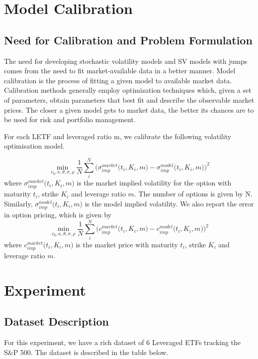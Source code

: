 \documentclass{article}
\begin{document}
\section{Model Calibration}
\subsection{Need for Calibration and Problem Formulation}
The need for developing stochastic volatility models and SV models with jumps comes from the need to fit market-available data in a better manner. Model calibration is the process of fitting a given model to available market data. Calibration methods generally employ optimization techniques which, given a set of parameters, obtain parameters that best fit and describe the observable market prices. The closer a given model gets to market data, the better its chances are to be used for risk and portfolio management. 
\newline\newline

For each LETF and leveraged ratio m, we calibrate the following volatility optimisation model.

\begin{equation}
    \min_{v_{0},\kappa,\theta,\sigma,\rho}\frac{1}{N}\sum_{i}^{N}\big(\sigma_{imp}^{market}\big(t_{i},K_{i},m\big) - \sigma_{imp}^{model}\big(t_{i},K_{i},m\big)\big)^2
\end{equation}
where $\sigma_{imp}^{market}\big(t_{i},K_{i},m\big)$ is the market implied volatility for the option with maturity $t_i$, strike $K_i$ and leverage ratio $m$. The number of options is given by N. Similarly, $\sigma_{imp}^{model}\big(t_{i},K_{i},m\big)$ is the model implied volatility. We also report the error in option pricing, which is given by
\begin{equation}
    \min_{v_{0},\kappa,\theta,\sigma,\rho}\frac{1}{N}\sum_{i}^{N}\big(c_{imp}^{market}\big(t_{i},K_{i},m\big) - c_{imp}^{model}\big(t_{i},K_{i},m\big)\big)^2
\end{equation}
where $c_{imp}^{market}\big(t_{i},K_{i},m\big)$ is the market price with maturity $t_i$, strike $K_i$ and leverage ratio $m$.

\section{Experiment}
\subsection{Dataset Description}
For this experiment, we have a rich dataset of 6 Leveraged ETFs tracking the S&P 500. The dataset is described in the table below. 
\end{document}

